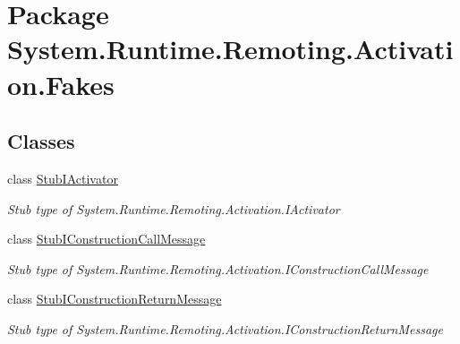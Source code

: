 \hypertarget{namespace_system_1_1_runtime_1_1_remoting_1_1_activation_1_1_fakes}{\section{Package System.\-Runtime.\-Remoting.\-Activation.\-Fakes}
\label{namespace_system_1_1_runtime_1_1_remoting_1_1_activation_1_1_fakes}
}
\subsection*{Classes}
\begin{DoxyCompactItemize}
\item 
class \hyperlink{class_system_1_1_runtime_1_1_remoting_1_1_activation_1_1_fakes_1_1_stub_i_activator}{Stub\-I\-Activator}
\begin{DoxyCompactList}\small\item\em Stub type of System.\-Runtime.\-Remoting.\-Activation.\-I\-Activator\end{DoxyCompactList}\item 
class \hyperlink{class_system_1_1_runtime_1_1_remoting_1_1_activation_1_1_fakes_1_1_stub_i_construction_call_message}{Stub\-I\-Construction\-Call\-Message}
\begin{DoxyCompactList}\small\item\em Stub type of System.\-Runtime.\-Remoting.\-Activation.\-I\-Construction\-Call\-Message\end{DoxyCompactList}\item 
class \hyperlink{class_system_1_1_runtime_1_1_remoting_1_1_activation_1_1_fakes_1_1_stub_i_construction_return_message}{Stub\-I\-Construction\-Return\-Message}
\begin{DoxyCompactList}\small\item\em Stub type of System.\-Runtime.\-Remoting.\-Activation.\-I\-Construction\-Return\-Message\end{DoxyCompactList}\end{DoxyCompactItemize}
